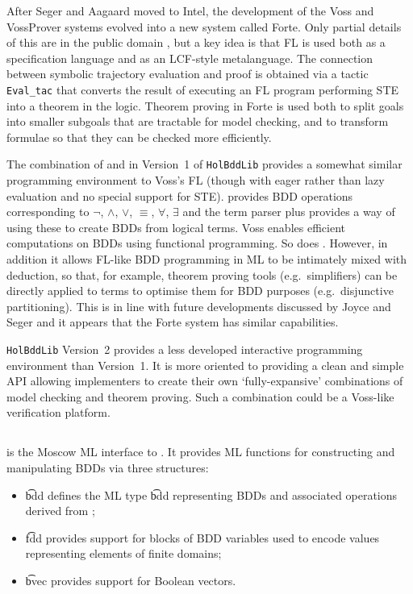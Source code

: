 After Seger and Aagaard moved to Intel, the development of the Voss and
VossProver systems evolved into a new system called Forte.  Only partial details
of this are in the public domain
\cite{oleary-itj-99,aagaard-tphols-99}, but a key idea is that FL is
used both as a specification language and as an LCF-style
metalanguage. The connection between symbolic trajectory evaluation
and proof is obtained via a tactic {\tt{Eval\_tac}} that converts the
result of executing an FL program performing STE into a theorem in the
logic. Theorem proving in Forte is used both to split goals into
smaller subgoals that are tractable for model checking, and to
transform formulae so that they can be checked more efficiently.

The combination of \HOL{} and \Buddy{} in Version~1 of
{\tt{HolBddLib}} provides a somewhat similar programming environment
to Voss's FL (though with eager rather than lazy evaluation and no
special support for STE). \Buddy{} provides BDD operations
corresponding to $\neg$, $\wedge$, $\vee$, $\equiv$, $\forall$,
$\exists$ and the \HOL{} term parser plus  provides a
way of using these to create BDDs from logical terms.  Voss enables
efficient computations on BDDs using functional programming. So does
. However, in addition it allows FL-like BDD programming
in ML to be intimately mixed with \HOL{} deduction, so that, for
example, theorem proving tools (e.g.~simplifiers) can be directly
applied to terms to optimise them for BDD purposes (e.g.~disjunctive
partitioning).  This is in line with future developments discussed by
Joyce and Seger \cite{JoyceSeger} and it appears that the Forte system
has similar capabilities.

{\tt{HolBddLib}} Version~2 provides a less developed interactive
programming environment than Version~1. It is more oriented to
providing a clean and simple API allowing implementers to create their
own `fully-expansive' combinations of model checking and theorem
proving. Such a combination could be a Voss-like verification
platform.



\subsection{\Muddy}\label{muddy}

\Muddy{} is the Moscow ML interface to \Buddy{}. It provides ML functions for constructing and
manipulating BDDs via three structures:

\begin{itemize}

\item \t{bdd} defines the ML type
\t{bdd} representing BDDs and associated operations derived from \Buddy{};


\item \t{fdd} provides support for blocks of BDD variables
used to encode values representing elements of finite domains;

\item \t{bvec} provides support for Boolean vectors.

\end{itemize}

